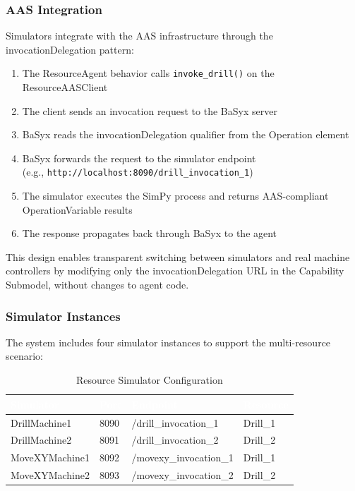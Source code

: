 \subsubsection{AAS Integration}

Simulators integrate with the \ac{AAS} infrastructure through the invocationDelegation pattern:

\begin{enumerate}
    \item The ResourceAgent behavior calls \texttt{invoke\_drill()} on the ResourceAASClient
    \item The client sends an invocation request to the BaSyx server
    \item BaSyx reads the invocationDelegation qualifier from the Operation element
    \item BaSyx forwards the request to the simulator endpoint\\
    (e.g., \texttt{http://localhost:8090/drill\_invocation\_1})
    \item The simulator executes the SimPy process and returns \ac{AAS}-compliant OperationVariable results
    \item The response propagates back through BaSyx to the agent
\end{enumerate}

This design enables transparent switching between simulators and real machine controllers by modifying only the invocationDelegation URL in the Capability Submodel, without changes to agent code.

\subsubsection{Simulator Instances}

The system includes four simulator instances to support the multi-resource scenario:

\begin{table}[ht]
\centering
\caption{Resource Simulator Configuration}
\label{tab:simulator_config}
\begin{tabular}{llll}
\toprule
\rowcolor{headerblue}
\textcolor{white}{Simulator} & \textcolor{white}{Port} & \textcolor{white}{Endpoint} & \textcolor{white}{Resource} \\
\midrule
DrillMachine1 & 8090 & /drill\_invocation\_1 & Drill\_1 \\
DrillMachine2 & 8091 & /drill\_invocation\_2 & Drill\_2 \\
MoveXYMachine1 & 8092 & /movexy\_invocation\_1 & Drill\_1 \\
MoveXYMachine2 & 8093 & /movexy\_invocation\_2 & Drill\_2 \\
\bottomrule
\end{tabular}
\end{table}

